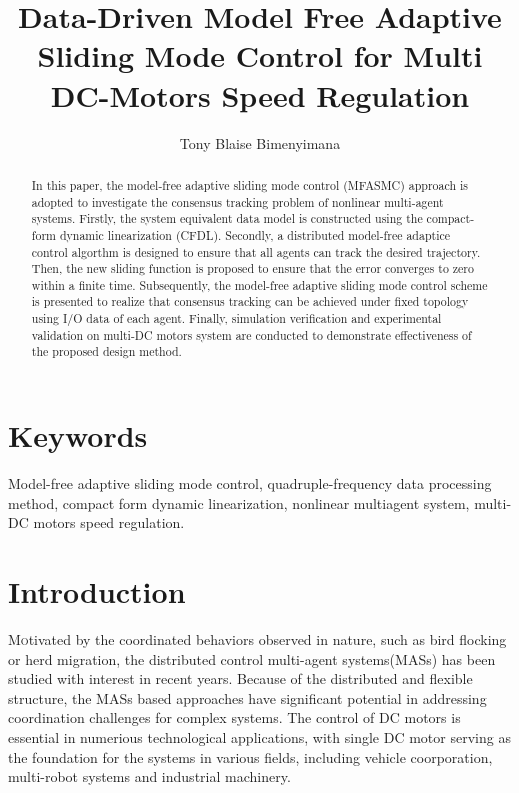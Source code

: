 \documentclass[journal,onecolumn]{IEEEtran}
\title{\LARGE Data-Driven Model Free Adaptive Sliding Mode Control for Multi DC-Motors Speed Regulation}
\author{Tony Blaise Bimenyimana}
\begin{document}
\maketitle


\begin{abstract}
    In this paper, the model-free adaptive sliding mode control (MFASMC) approach is adopted to investigate the consensus tracking problem of nonlinear multi-agent systems. Firstly, the system equivalent data model is constructed using the compact-form dynamic linearization (CFDL). Secondly, a distributed model-free adaptice control algorthm is designed to ensure that all agents can track the desired trajectory. Then, the new sliding function is proposed to ensure that the error converges to zero within a finite time. Subsequently, the model-free adaptive sliding mode control scheme is presented to realize that consensus tracking can be achieved under fixed topology using I/O data of each agent. Finally, simulation verification and experimental validation on multi-DC motors system are conducted to demonstrate effectiveness of the proposed design method.
\end{abstract}

\section*{Keywords}
Model-free adaptive sliding mode control, quadruple-frequency data processing method, compact form dynamic linearization, nonlinear multiagent system, multi-DC motors speed regulation.




\section{Introduction}\label{section:1}

\lettrine{M}otivated by the coordinated behaviors observed in nature, such as bird flocking or herd migration, the distributed control multi-agent systems(MASs) has been studied with interest in recent years.\cite{1} Because of the distributed and flexible structure, the MASs based approaches have significant potential in addressing coordination challenges for complex systems\cite{2}. The control of DC motors is essential in numerious technological applications, with single DC motor serving as the foundation for the systems in various fields, including vehicle coorporation\cite{3}, multi-robot systems and industrial machinery\cite{4}. 
\end{document}
